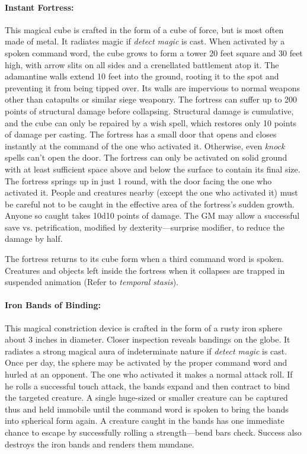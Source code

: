 \begin{multicols}{2}
\paragraph{Instant Fortress:} This magical cube is crafted in the form of a cube of force, but is most often made of metal.  It radiates magic if \textit{detect magic} is cast.  When activated by a spoken command word, the cube grows to form a tower 20 feet square and 30 feet high, with arrow slits on all sides and a crenellated battlement atop it.  The adamantine walls extend 10 feet into the ground, rooting it to the spot and preventing it from being tipped over.  Its walls are impervious to normal weapons other than catapults or similar siege weaponry.  The fortress can suffer up to 200 points of structural damage before collapsing.  Structural damage is cumulative, and the cube can only be repaired by a wish spell, which restores only 10 points of damage per casting.  The fortress has a small door that opens and closes instantly at the command of the one who activated it.  Otherwise, even \textit{knock} spells can't open the door.  The fortress can only be activated on solid ground with at least sufficient space above and below the surface to contain its final size.  The fortress springs up in just 1 round, with the door facing the one who activated it.  People and creatures nearby (except the one who activated it) must be careful not to be caught in the effective area of the fortress's sudden growth.  Anyone so caught takes 10d10 points of damage.  The GM may allow a successful save vs. petrification, modified by dexterity---surprise modifier, to reduce the damage by half.  

The fortress returns to its cube form when a third command word is spoken.  Creatures and objects left inside the fortress when it collapses are trapped in suspended animation (Refer to \textit{temporal stasis}).

\paragraph{Iron Bands of Binding:} This magical constriction device is crafted in the form of a rusty iron sphere about 3 inches in diameter.  Closer inspection reveals bandings on the globe.  It radiates a strong magical aura of indeterminate nature if \textit{detect magic} is cast.  Once per day, the sphere may be activated by the proper command word and hurled at an opponent.  The one who activated it makes a normal attack roll.  If he rolls a successful touch attack, the bands expand and then contract to bind the targeted creature.  A single huge-sized or smaller creature can be captured thus and held immobile until the command word is spoken to bring the bands into spherical form again.  A creature caught in the bands has one immediate chance to escape by successfully rolling a strength---bend bars check.  Success also destroys the iron bands and renders them mundane.


\end{multicols}
